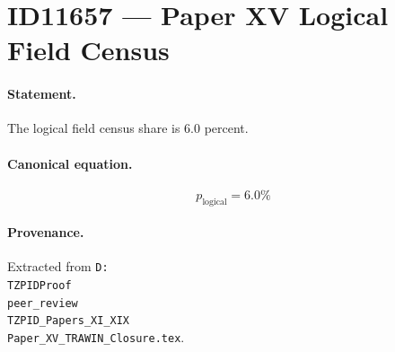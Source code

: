 \section*{ID11657 --- Paper XV Logical Field Census}

\paragraph{Statement.}
The logical field census share is 6.0 percent.

\paragraph{Canonical equation.}
\[
p_{\mathrm{logical}}=6.0\%
\]

\paragraph{Provenance.}
Extracted from \texttt{D:\\TZPIDProof\\peer\_review\\TZPID\_Papers\_XI\_XIX\\Paper\_XV\_TRAWIN\_Closure.tex}.
